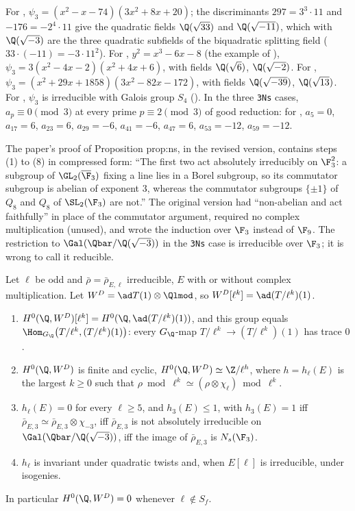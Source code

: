 \begin{example}\label{ex:galrep:ns-examples}
For , $\psi_3=(x^2-x-74)(3x^2+8x+20)$; the discriminants $297=3^3\cdot11$ and $-176=-2^4\cdot11$ give the quadratic fields $\Q(\sqrt{33})$ and
$\Q(\sqrt{-11})$, which with $\Q(\sqrt{-3})$ are the three quadratic subfields of the biquadratic splitting field ($33\cdot(-11)=-3\cdot11^2$). For ,
$y^2=x^3-6x-8$ (the example of ), $\psi_3=3(x^2-4x-2)(x^2+4x+6)$, with fields $\Q(\sqrt6)$, $\Q(\sqrt{-2})$. For ,
$\psi_3=(x^2+29x+1858)(3x^2-82x-172)$, with fields $\Q(\sqrt{-39})$, $\Q(\sqrt{13})$. For , $\psi_3$ is irreducible with Galois group $S_4$
(). In the three \texttt{3Ns} cases, $a_p\equiv0\pmod3$ at every prime $p\equiv2\pmod3$ of good reduction: for , $a_5=0$,
$a_{17}=6$, $a_{23}=6$, $a_{29}=-6$, $a_{41}=-6$, $a_{47}=6$, $a_{53}=-12$, $a_{59}=-12$.
\end{example}

\begin{paperlink}
The paper's proof of Proposition prop:ns, in the revised version, contains steps (1) to (8) in compressed form: ``The first two act absolutely
irreducibly on $\F_3^2$: a subgroup of $\GL_2(\overline\F_3)$ fixing a line lies in a Borel subgroup, so its commutator subgroup is abelian of exponent $3$,
whereas the commutator subgroups $\{\pm1\}$ of $Q_8$ and $Q_8$ of $\SL_2(\F_3)$ are not.'' The original version had ``non-abelian and act
faithfully'' in place of the commutator argument, required no complex multiplication (unused), and wrote the induction over $\F_3$ instead of $\F_9$.
The restriction to $\Gal(\Qbar/\Q(\sqrt{-3}))$ in the \texttt{3Ns} case is irreducible over $\F_3$; it is wrong to call it reducible.
\end{paperlink}

\begin{lemma}\label{lem:galrep:h0}
Let $\ell$ be odd and $\bar\rho=\bar\rho_{E,\ell}$ irreducible, $E$ with or without complex multiplication. Let $W^D=\ad T(1)\otimes\Qlmod$, so $W^D[\ell^k]=\ad(T/\ell^k)(1)$.
\begin{enumerate}[label=(\roman*)]
\item $H^0(\Q,W^D)[\ell^k]=H^0(\Q,\ad(T/\ell^k)(1))$, and this group equals $\Hom_{G_\Q}\bigl(T/\ell^k,(T/\ell^k)(1)\bigr)$: every $G_\Q$-map $T/\ell^k\to(T/\ell^k)(1)$ has trace $0$.
\item $H^0(\Q,W^D)$ is finite and cyclic, $H^0(\Q,W^D)\simeq\Z/\ell^{h}$, where $h=h_\ell(E)$ is the largest $k\ge0$ such that
$\rho\bmod\ell^k\simeq(\rho\otimes\chi_\ell)\bmod\ell^k$.
\item $h_\ell(E)=0$ for every $\ell\ge5$, and $h_3(E)\le1$, with $h_3(E)=1$ iff $\bar\rho_{E,3}\simeq\bar\rho_{E,3}\otimes\chi_{-3}$, iff $\bar\rho_{E,3}$ is not absolutely irreducible on
$\Gal(\Qbar/\Q(\sqrt{-3}))$, iff the image of $\bar\rho_{E,3}$ is $N_s(\F_3)$.
\item $h_\ell$ is invariant under quadratic twists and, when $E[\ell]$ is irreducible, under isogenies.
\end{enumerate}
In particular $H^0(\Q,W^D)=0$ whenever $\ell\notin S_f$.
\end{lemma}

